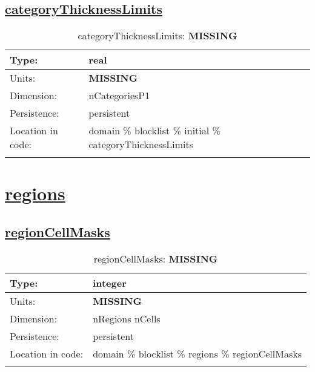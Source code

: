 \subsection[categoryThicknessLimits]{\hyperref[sec:var_tab_initial]{categoryThicknessLimits}}
\label{subsec:var_sec_initial_categoryThicknessLimits}
\begin{center}
\begin{longtable}{| p{2.0in} | p{4.0in} |}
        \hline 
        Type: & real \\
        \hline 
        Units: & {\bf \color{red} MISSING} \\
        \hline 
        Dimension: & nCategoriesP1 \\
        \hline 
        Persistence: & persistent \\
        \hline 
         Location in code: & domain \% blocklist \% initial \% categoryThicknessLimits \\
         \hline 
    \caption{categoryThicknessLimits: {\bf \color{red} MISSING}}
\end{longtable}
\end{center}
\section[regions]{\hyperref[sec:var_tab_regions]{regions}}
\label{sec:var_sec_regions}
\subsection[regionCellMasks]{\hyperref[sec:var_tab_regions]{regionCellMasks}}
\label{subsec:var_sec_regions_regionCellMasks}
\begin{center}
\begin{longtable}{| p{2.0in} | p{4.0in} |}
        \hline 
        Type: & integer \\
        \hline 
        Units: & {\bf \color{red} MISSING} \\
        \hline 
        Dimension: & nRegions nCells \\
        \hline 
        Persistence: & persistent \\
        \hline 
         Location in code: & domain \% blocklist \% regions \% regionCellMasks \\
         \hline 
    \caption{regionCellMasks: {\bf \color{red} MISSING}}
\end{longtable}
\end{center}
